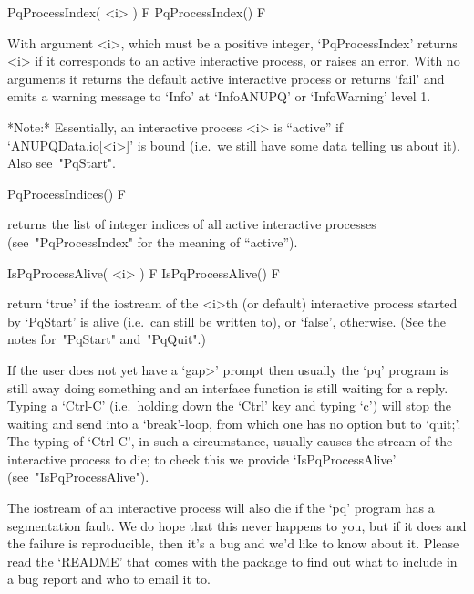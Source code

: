 
\>PqProcessIndex( <i> ) F
\>PqProcessIndex() F

With argument <i>, which must be  a  positive  integer,  `PqProcessIndex'
returns <i> if it corresponds to an active interactive process, or raises
an error. With no arguments it returns  the  default  active  interactive
process or returns `fail' and  emits  a  warning  message  to  `Info'  at
`InfoANUPQ' or `InfoWarning' level 1.

*Note:*
Essentially,  an  interactive  {\ANUPQ}  process  <i>  is  ``active''  if
`ANUPQData.io[<i>]' is bound (i.e.~we still have  some  data  telling  us
about it). Also see~"PqStart".

\>PqProcessIndices() F

returns the list of integer indices of all  active  interactive  {\ANUPQ}
processes (see~"PqProcessIndex" for the meaning of ``active'').

\>IsPqProcessAlive( <i> ) F
\>IsPqProcessAlive() F

return  `true'  if  the  {\GAP}  iostream  of  the  <i>th  (or   default)
interactive {\ANUPQ} process started  by  `PqStart'  is  alive  (i.e.~can
still be written to), or `false', otherwise. (See the notes for~"PqStart"
and~"PqQuit".)

If the user does not yet have a  `gap>'  prompt  then  usually  the  `pq'
program is still away doing something and an {\ANUPQ}  interface  function
is still waiting for a reply. Typing a `Ctrl-C'  (i.e.~holding  down  the
`Ctrl' key and typing `c') will stop the waiting and send {\GAP}  into  a
`break'-loop, from which one has no option but to `quit;'. The typing  of
`Ctrl-C', in such a  circumstance,  usually  causes  the  stream  of  the
interactive  {\ANUPQ}  process  to  die;  to  check   this   we   provide
`IsPqProcessAlive' (see~"IsPqProcessAlive").

The {\GAP} iostream of an interactive {\ANUPQ} process will also  die  if
the `pq' program has a segmentation fault. We do  hope  that  this  never
happens to you, but if it does and the failure is reproducible, then it's
a bug and we'd like to know about it. Please read the `README' that comes
with the {\ANUPQ} package to find out what to include in a bug report and
who to email it to.


